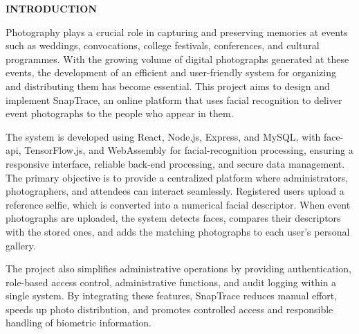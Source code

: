 
\begin{center}
    \vspace*{\fill}
    \fontsize{28}{28}\selectfont \textbf{INTRODUCTION}
    \vspace*{\fill}
\end{center}
\clearpage
\vspace*{0.5cm}
\vspace{0.5cm}
{ \normalfont \fontsize{12pt}{15pt}\selectfont
    \par
    \noindent Photography plays a crucial role in capturing and preserving memories at events such as weddings, convocations, college festivals, conferences, and cultural programmes. With the growing volume of digital photographs generated at these events, the development of an efficient and user-friendly system for organizing and distributing them has become essential. This project aims to design and implement SnapTrace, an online platform that uses facial recognition to deliver event photographs to the people who appear in them.\par
}
\vspace{0.4cm}
{ \normalfont \fontsize{12pt}{15pt}\selectfont
    \par
    \noindent The system is developed using React, Node.js, Express, and MySQL, with face-api, TensorFlow.js, and WebAssembly for facial-recognition processing, ensuring a responsive interface, reliable back-end processing, and secure data management. The primary objective is to provide a centralized platform where administrators, photographers, and attendees can interact seamlessly. Registered users upload a reference selfie, which is converted into a numerical facial descriptor. When event photographs are uploaded, the system detects faces, compares their descriptors with the stored ones, and adds the matching photographs to each user's personal gallery. \par
}
\vspace{0.4cm}

{ \normalfont \fontsize{12pt}{15pt}\selectfont
    \par
    \noindent The project also simplifies administrative operations by providing authentication, role-based access control, administrative functions, and audit logging within a single system. By integrating these features, SnapTrace reduces manual effort, speeds up photo distribution, and promotes controlled access and responsible handling of biometric information.
}
\vspace{0.4cm}

